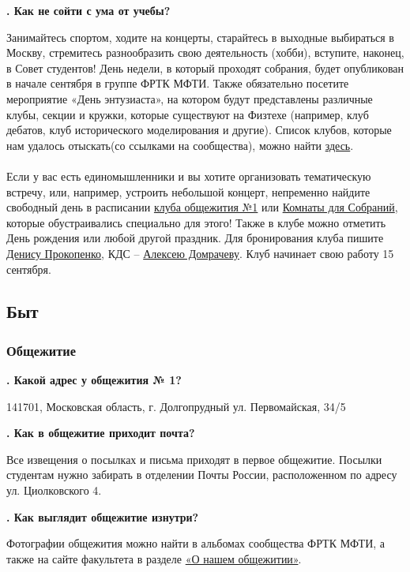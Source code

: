 \documentclass[14pt]{extarticle}
\newcounter{question}
\newcommand\Que[1]{%
    \begin{minipage}{\textwidth}
    \leavevmode\par
    \stepcounter{question}
    \noindent
    {\large\textbf{\thequestion. #1}}\par}
\newcommand\Ans[2][]{%
    \leavevmode\par\noindent
    {\leftskip37pt
    \textbf{#1}#2\par}
    \end{minipage}}
\begin{document}
\Que{Как не сойти с ума от учебы?}
\Ans{Занимайтесь спортом, ходите на концерты, старайтесь в выходные выбираться в Москву, стремитесь разнообразить свою деятельность (хобби), вступите, наконец, в Совет студентов! День недели, в который проходят собрания, будет опубликован в начале сентября в группе ФРТК МФТИ. Также обязательно посетите мероприятие «День энтузиаста», на котором будут представлены различные клубы, секции и кружки, которые существуют на Физтехе (например, клуб дебатов, клуб исторического моделирования и другие). Список клубов, которые нам удалось отыскать(со ссылками на сообщества), можно найти \href{https://vk.com/page-17708_53470574}{здесь}. \\ \\ Если у вас есть единомышленники и вы хотите организовать тематическую встречу, или, например, устроить небольшой концерт, непременно найдите свободный день в расписании \href{https://calendar.google.com/calendar/embed?src=ffse5gki3k4f9j266789sbj5ns@group.calendar.google.com&ctz=Europe/Moscow}{клуба общежития №1} или \href{https://frtk.mipt.ru/services/meeting/}{Комнаты для Собраний}, которые обустраивались специально для этого! Также в клубе можно отметить День рождения или любой другой праздник. Для бронирования клуба пишите \href{https://vk.com/denproc}{Денису Прокопенко}, КДС -- \href{https://vk.com/domrachev_alexey}{Алексею Домрачеву}. Клуб начинает свою работу 15 сентября.}


\clearpage
\setcounter{question}{0}
\subsection{Быт}
\subsubsection{Общежитие}

\Que{Какой адрес у общежития № 1?}
\Ans{141701, Московская область, г. Долгопрудный ул. Первомайская, 34/5}

\Que{Как в общежитие приходит почта?}
\Ans{Все извещения о посылках и письма приходят в первое общежитие. Посылки студентам нужно забирать в отделении Почты России, расположенном по адресу ул. Циолковского 4.}

\Que{Как выглядит общежитие изнутри?}
\Ans{Фотографии общежития можно найти в альбомах сообщества ФРТК МФТИ, а также на сайте факультета в разделе \href{https://mipt.ru/drec/forstudents/Dormitory/aboutDormitory.php}{«О нашем общежитии»}.}
\end{document}
